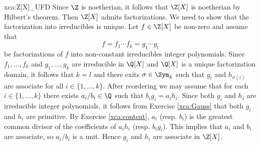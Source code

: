 \begin{sol}{xca:Z[X]_UFD}
	Since $\Z$ is noetherian, it follows that $\Z[X]$ is noetherian by Hilbert's theorem. 
	Then $\Z[X]$ admits factorizations. We need to show that the factorization into irreducibles is unique. 
	Let $f\in\Z[X]$ be non-zero and
	assume that 
	\[
	f=f_1\cdots f_k=g_1\cdots g_l
	\]
	be factorizations of $f$ into non-constant irreducibles integer polynomials. Since
	$f_1,\dots,f_k$ and $g_1,\dots,g_k$ 
	are irreducible in $\Q[X]$ and $\Q[X]$ is a unique factorization domain, it follows
	that $k=l$ and there exits $\sigma\in\Sym_k$ such that $g_i$ and $h_{\sigma(i)}$ are
	associate for all $i\in\{1,\dots,k\}$. After reordering we may assume that 
	for each $i\in\{1,\dots,k\}$ there
	exists $a_i/b_i\in\Q$ such that $b_ig_i=a_ih_i$. Since both $g_i$ and $h_i$ are
	irreducible integer polynomials, it follows from Exercise \ref{xca:Gauss} that
	both $g_i$ and $h_i$ are primitive. By Exercise \ref{xca:content}, 
	$a_i$ (resp. $b_i$) is the greatest common divisor of the coefficients 
	of $a_ih_i$ (resp. $b_ig_i$). This implies that $a_i$ and $b_i$ are associate, so 
	$a_i/b_i$ is a unit. Hence $g_i$ and $h_i$ are associate in $\Z[X]$.     
\end{sol}

%	
%	
%	

